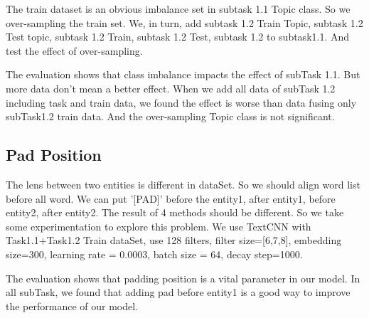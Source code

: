 The train dataset is an obvious imbalance set in subtask 1.1 Topic class. So we over-sampling the train set. We, in turn, add subtask 1.2 Train Topic, subtask 1.2 Test topic, subtask 1.2 Train, subtask 1.2 Test, subtask 1.2 to subtask1.1. And test the effect of over-sampling.



The evaluation shows that class imbalance impacts the effect of subTask 1.1. But more data don't mean a better effect. When we add all data of subTask 1.2 including task and train data, we found the effect is worse than data fusing only subTask1.2 train data. And the over-sampling Topic class is not significant.

\subsection{Pad Position}
\label{sec:pad_position}

The lens between two entities is different in dataSet. So we should align word list before all word. We can put '[PAD]' before the entity1, after entity1, before entity2, after entity2. The result of 4 methods should be different. So we take some experimentation to explore this problem. We use TextCNN with Task1.1+Task1.2 Train dataSet, use 128 filters, filter size=[6,7,8], embedding size=300, learning rate = 0.0003, batch size = 64, decay step=1000.



The evaluation shows that padding position is a vital parameter in our model. In all subTask, we found that adding pad before entity1 is a good way to improve the performance of our model.